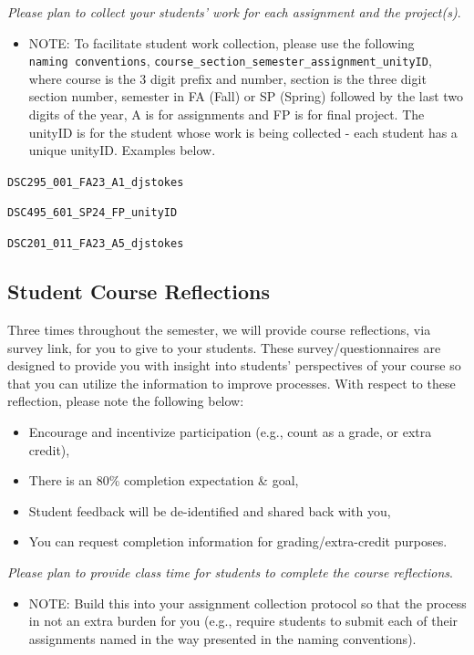 \documentclass[
]{book}
\providecommand{\tightlist}{%
  \setlength{\itemsep}{0pt}\setlength{\parskip}{0pt}}
\begin{document}
{ \emph{Please plan to collect your students' work for each assignment and the project(s)}. }

\begin{itemize}
\tightlist
\item
  NOTE: To facilitate student work collection, please use the following \texttt{naming\ conventions}, \texttt{course\_section\_semester\_assignment\_unityID}, where course is the 3 digit prefix and number, section is the three digit section number, semester in FA (Fall) or SP (Spring) followed by the last two digits of the year, A is for assignments and FP is for final project. The unityID is for the student whose work is being collected - each student has a unique unityID. Examples below.
\end{itemize}

\texttt{DSC295\_001\_FA23\_A1\_djstokes}

\texttt{DSC495\_601\_SP24\_FP\_unityID}

\texttt{DSC201\_011\_FA23\_A5\_djstokes}

\hypertarget{student-course-reflections}{%
\subsection{Student Course Reflections}\label{student-course-reflections}}

Three times throughout the semester, we will provide course reflections, via survey link, for you to give to your students. These survey/questionnaires are designed to provide you with insight into students' perspectives of your course so that you can utilize the information to improve processes. With respect to these reflection, please note the following below:

\begin{itemize}
\tightlist
\item
  Encourage and incentivize participation (e.g., count as a grade, or extra credit),
\item
  There is an 80\% completion expectation \& goal,
\item
  Student feedback will be de-identified and shared back with you,
\item
  You can request completion information for grading/extra-credit purposes.
\end{itemize}

{ \emph{Please plan to provide class time for students to complete the course reflections}. }

\begin{itemize}
\tightlist
\item
  NOTE: Build this into your assignment collection protocol so that the process in not an extra burden for you (e.g., require students to submit each of their assignments named in the way presented in the naming conventions).
\end{itemize}
\end{document}
